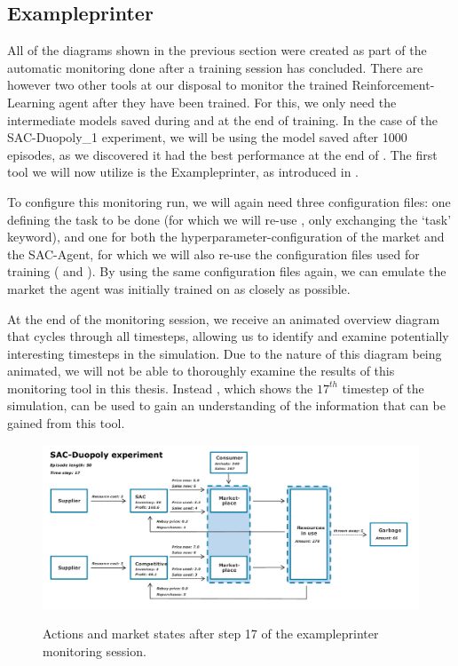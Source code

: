 \subsection*{Exampleprinter}

All of the diagrams shown in the previous section were created as part of the automatic monitoring done after a training session has concluded. There are however two other tools at our disposal to monitor the trained Reinforcement-Learning agent after they have been trained. For this, we only need the intermediate models saved during and at the end of training. In the case of the SAC-Duopoly\_1 experiment, we will be using the model saved after 1000 episodes, as we discovered it had the best performance at the end of . The first tool we will now utilize is the Exampleprinter, as introduced in .

To configure this monitoring run, we will again need three configuration files: one defining the task to be done (for which we will re-use , only exchanging the `task' keyword), and one for both the hyperparameter-configuration of the market and the SAC-Agent, for which we will also re-use the configuration files used for training ( and ). By using the same configuration files again, we can emulate the market the agent was initially trained on as closely as possible.

At the end of the monitoring session, we receive an animated overview diagram that cycles through all timesteps, allowing us to identify and examine potentially interesting timesteps in the simulation. Due to the nature of this diagram being animated, we will not be able to thoroughly examine the results of this monitoring tool in this thesis. Instead , which shows the $17^{th}$ timestep of the simulation, can be used to gain an understanding of the information that can be gained from this tool.

\begin{figure}[t]
	\centering
	\includegraphics[width = \textwidth]{images/experiments/SACDuopoly/exampleprinter/ExampleprinterStep17.pdf}\\
	\caption{Actions and market states after step 17 of the exampleprinter monitoring session.}\label{fig:SACDuopolyExampleprinter17}
\end{figure}


